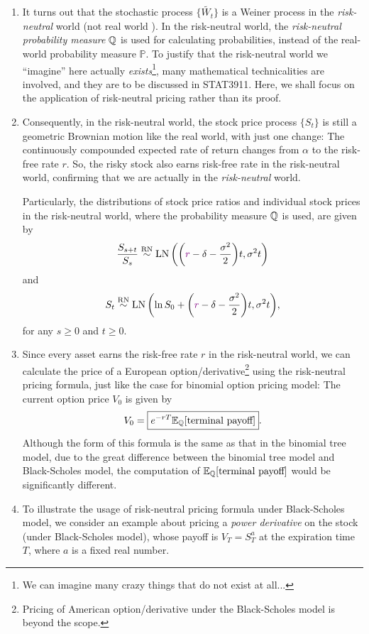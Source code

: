 \begin{enumerate}
\item It turns out that the stochastic process \(\{\widetilde{W_t}\}\) is a Weiner
process in the \emph{risk-neutral} world (not real world \warn{}). In the
risk-neutral world, the \emph{risk-neutral probability measure} \(\mathbb{Q}\) is used
for calculating probabilities, instead of the real-world probability measure
\(\mathbb{P}\). To justify that the risk-neutral world we ``imagine'' here
actually \emph{exists}\footnote{We can imagine many crazy things that do not
exist at all...}, many mathematical technicalities are involved, and they are
to be discussed in STAT3911. Here, we shall focus on the application of
risk-neutral pricing rather than its proof.

\item Consequently, in the risk-neutral world, the stock price process \(\{S_t\}\) is
still a geometric Brownian motion like the real world, with just one change:
The continuously compounded expected rate of return changes from \(\alpha\) to
the risk-free rate \(r\). So, the risky stock also earns risk-free rate in the
risk-neutral world, confirming that we are actually in the \emph{risk-neutral}
world.

Particularly, the distributions of stock price ratios and individual stock
prices in the risk-neutral world, where the probability measure \(\mathbb{Q}\) is used,
are given by
\[
\frac{S_{s+t}}{S_s}\overset{\mathrm{RN}}{\sim}\operatorname{LN}\qty(\qty({\color{violet}r}-\delta-\frac{\sigma^2}{2})t,\sigma^{2}t)
\]
and
\[
S_t\overset{\mathrm{RN}}{\sim}\operatorname{LN}\qty(\ln S_0+\qty({\color{violet}r}-\delta-\frac{\sigma^2}{2})t,\sigma^{2}t),
\]
for any \(s\ge 0\) and \(t\ge 0\).

\item \label{it:bs-rn-pricing-fmla}
Since every asset earns the risk-free rate \(r\) in the risk-neutral
world, we can calculate the price of a European
option/derivative\footnote{Pricing of American option/derivative under the
Black-Scholes model is beyond the scope.} using the risk-neutral pricing
formula, just like the case for binomial option pricing model: The current
option price \(V_0\) is given by
\[
V_0=\boxed{e^{-rT}\mathbb{E}_{\mathbb{Q}}\qty[\text{terminal payoff}]}.
\]
Although the form of this formula is the same as that in the binomial tree
model, due to the great difference between the binomial tree model and
Black-Scholes model, the computation of \(\mathbb{E}_{\mathbb{Q}}\qty[\text{terminal payoff}]\)
would be significantly different.

\item To illustrate the usage of risk-neutral pricing formula under
Black-Scholes model, we consider an example about pricing a \emph{power
derivative} on the stock  (under Black-Scholes model), whose
payoff is \(V_T=S_T^{a}\) at the expiration time \(T\), where \(a\) is a fixed
real number.


\end{enumerate}
